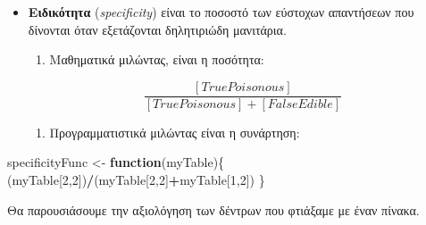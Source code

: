 \documentclass[
]{article}
\newenvironment{Shaded}{\begin{snugshade}}{\end{snugshade}}
\newcommand{\ControlFlowTok}[1]{\textcolor[rgb]{0.13,0.29,0.53}{\textbf{#1}}}
\newcommand{\DecValTok}[1]{\textcolor[rgb]{0.00,0.00,0.81}{#1}}
\newcommand{\NormalTok}[1]{#1}
\newcommand{\OtherTok}[1]{\textcolor[rgb]{0.56,0.35,0.01}{#1}}
\newcommand{\SpecialCharTok}[1]{\textcolor[rgb]{0.81,0.36,0.00}{\textbf{#1}}}
\providecommand{\tightlist}{%
  \setlength{\itemsep}{0pt}\setlength{\parskip}{0pt}}
\begin{document}
\begin{itemize}
\item
  \textbf{Ειδικότητα} (\emph{specificity}) είναι το ποσοστό των εύστοχων
  απαντήσεων που δίνονται όταν εξετάζονται δηλητιριώδη μανιτάρια.

  \begin{enumerate}
  \def\labelenumi{\arabic{enumi}.}
  \tightlist
  \item
    Μαθηματικά μιλώντας, είναι η ποσότητα:
  \end{enumerate}

  \[
  \dfrac{[TruePoisonous]}{[TruePoisonous]+[FalseEdible]}
  \]

  \begin{enumerate}
  \def\labelenumi{\arabic{enumi}.}
  \setcounter{enumi}{1}
  \tightlist
  \item
    Προγραμματιστικά μιλώντας είναι η συνάρτηση:
  \end{enumerate}
\end{itemize}

\begin{Shaded}
\begin{Highlighting}[]
\NormalTok{specificityFunc }\OtherTok{\textless{}{-}} \ControlFlowTok{function}\NormalTok{(myTable)\{}
\NormalTok{  (myTable[}\DecValTok{2}\NormalTok{,}\DecValTok{2}\NormalTok{])}\SpecialCharTok{/}\NormalTok{(myTable[}\DecValTok{2}\NormalTok{,}\DecValTok{2}\NormalTok{]}\SpecialCharTok{+}\NormalTok{myTable[}\DecValTok{1}\NormalTok{,}\DecValTok{2}\NormalTok{])}
\NormalTok{\}}
\end{Highlighting}
\end{Shaded}

Θα παρουσιάσουμε την αξιολόγηση των δέντρων που φτιάξαμε με έναν πίνακα.
\end{document}
